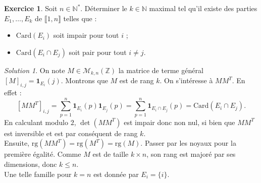 \documentclass[french]{book}
\newcommand{\N}{\mathbb{N}}
\newcommand{\Z}{\mathbb{Z}}
\newcommand{\st}{^*}
\newcommand{\card}{\text{Card}}
\newcommand{\rg}{\text{rg}}
\theoremstyle{definition}
\newtheorem{ex}{Exercice}[chapter]
\theoremstyle{remark}
\newtheorem*{sol}{Solution}
\begin{document}
\begin{ex}
	Soit $n\in\N\st$. Déterminer le $k\in\N$ maximal tel qu'il existe des parties $E_1,\ldots,E_k$ de $\llbracket 1,n\rrbracket$ telles que :
	\begin{itemize}
		\item $\card(E_i)$ soit impair pour tout $i$ ;
		\item $\card(E_i\cap E_j)$ soit pair pour tout $i\ne j$.
	\end{itemize}
\end{ex}
\begin{sol}
	On note $M\in\mathcal{M}_{k,n}(\Z)$ la matrice de terme général $[M]_{i,j}=\textbf{1}_{E_i}(j)$. Montrons que $M$ est de rang $k$. On s'intéresse à $MM^T$. En effet :
	$$[MM^T]_{i,j}=\sum_{p=1}^{n}\textbf{1}_{E_i}(p)\textbf{1}_{E_j}(p)=\sum_{p=1}^{n}\textbf{1}_{E_i\cap E_j}(p)=\card(E_i\cap E_j).$$
	En calculant modulo $2$, $\det(MM^T)$ est impair donc non nul, si bien que $MM^T$ est inversible et est par conséquent de rang $k$. \\
	Ensuite, $\rg(MM^T)=\rg(M^T)=\rg(M)$. Passer par les noyaux pour la première égalité. Comme $M$ est de taille $k\times n$, son rang est majoré par ses dimensions, donc $k\leqslant n$. \\
	Une telle famille pour $k=n$ est donnée par $E_i=\{i\}$.
\end{sol}
\end{document}
